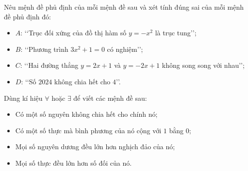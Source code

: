 \begin{bt}%
	Nêu mệnh đề phủ định của mỗi mệnh đề sau và xét tính đúng sai của mỗi mệnh đề phủ định đó:
	\begin{itemize}
		\item[a)] $A$: \lq\lq Trục đối xứng của đồ thị hàm số $y=-x^2$ là trục tung\rq\rq;
		\item[b)] $B$: \lq\lq Phương trình $3x^2+1=0$ có nghiệm\rq\rq;
		\item[c)] $C$: \lq\lq Hai đường thẳng $y=2x+1$ và $y=-2x+1$ không song song với nhau\rq\rq;
		\item[d)] $D$: \lq\lq Số $2024$ không chia hết cho $4$\rq\rq.
	\end{itemize}
\end{bt}

\begin{bt}%
	Dùng kí hiệu $\forall$ hoặc $\exists$ để viết các mệnh đề sau:
	\begin{itemize}
		\item[a)] Có một số nguyên không chia hết cho chính nó;
		\item[b)] Có một số thực mà bình phương của nó cộng với $1$ bằng $0$;
		\item[c)] Mọi số nguyên dương đều lớn hơn nghịch đảo của nó;
		\item[d)] Mọi số thực đều lớn hơn số đối của nó.
	\end{itemize}
\end{bt}


